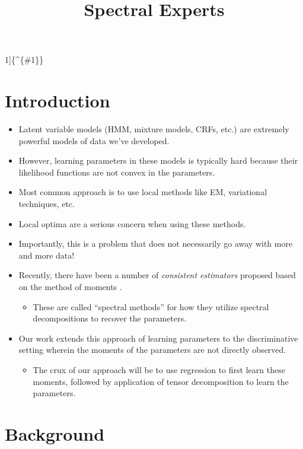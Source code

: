 \documentclass[tablecaption=bottom]{jmlr}
\title{Spectral Experts}
\author{\Name{Arun Tejasvi Chaganty} \Email{chaganty@stanford.edu}}
\begin{document}
\maketitle

\newcommand{\tp}

{[}1{]}\{\^{}\{\otimes \#1\}\}
\newcommand{\opX}{\mathfrak{X}}

\newcommand{\cvec}{\textrm{cvec}}

\section{Introduction}

\begin{itemize}
\item
  Latent variable models (HMM, mixture models, CRFs, etc.) are extremely
  powerful models of data we've developed.
\item
  However, learning parameters in these models is typically hard because
  their likelihood functions are not convex in the parameters.
\item
  Most common approach is to use local methods like EM, variational
  techniques, etc.
\item
  Local optima are a serious concern when using these methods.
\item
  Importantly, this is a problem that does not necessarily go away with
  more and more data!
\item
  Recently, there have been a number of \emph{consistent estimators}
  proposed based on the method of moments .
  \begin{itemize}
  \item
    These are called ``spectral methods'' for how they utilize spectral
    decompositions to recover the parameters.
  \end{itemize}
\item
  Our work extends this approach of learning parameters to the
  discriminative setting wherein the moments of the parameters are not
  directly observed.
  \begin{itemize}
  \item
    The crux of our approach will be to use regression to first learn
    these moments, followed by application of tensor decomposition to
    learn the parameters.
  \end{itemize}
\end{itemize}
\section{Background}
\end{document}
